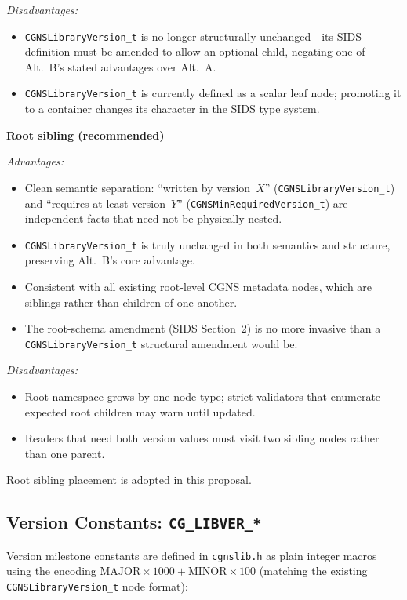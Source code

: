\documentclass[11pt,letterpaper]{article}
\begin{document}
\textit{Disadvantages:}
\begin{itemize}[leftmargin=2em]
\item \texttt{CGNSLibraryVersion\_t} is no longer structurally
  unchanged---its SIDS definition must be amended to allow an
  optional child, negating one of Alt.~B's stated advantages over
  Alt.~A.
\item \texttt{CGNSLibraryVersion\_t} is currently defined as a
  scalar leaf node; promoting it to a container changes its
  character in the SIDS type system.
\end{itemize}

\textbf{Root sibling (recommended)}

\textit{Advantages:}
\begin{itemize}[leftmargin=2em]
\item Clean semantic separation: ``written by version~$X$''
  (\texttt{CGNSLibraryVersion\_t}) and ``requires at least
  version~$Y$'' (\texttt{CGNSMinRequiredVersion\_t}) are independent
  facts that need not be physically nested.
\item \texttt{CGNSLibraryVersion\_t} is truly unchanged in both
  semantics and structure, preserving Alt.~B's core advantage.
\item Consistent with all existing root-level CGNS metadata nodes,
  which are siblings rather than children of one another.
\item The root-schema amendment (SIDS Section~2) is no more invasive
  than a \texttt{CGNSLibraryVersion\_t} structural amendment would be.
\end{itemize}

\textit{Disadvantages:}
\begin{itemize}[leftmargin=2em]
\item Root namespace grows by one node type; strict validators that
  enumerate expected root children may warn until updated.
\item Readers that need both version values must visit two sibling
  nodes rather than one parent.
\end{itemize}

Root sibling placement is adopted in this proposal.

\subsection{Version Constants: \texttt{CG\_LIBVER\_*}}
\label{sec:version-constants}

Version milestone constants are defined in \texttt{cgnslib.h} as
plain integer macros using the encoding
$\mathrm{MAJOR} \times 1000 + \mathrm{MINOR} \times 100$
(matching the existing \texttt{CGNSLibraryVersion\_t} node format):
\end{document}
